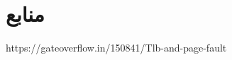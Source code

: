 \documentclass{article}
\begin{document}
\section*{منابع}
\renewcommand{\section}[2]{}%
\begin{thebibliography}{99} %


\begin{LTRitems}

\resetlatinfont

https://gateoverflow.in/150841/Tlb-and-page-fault

\end{LTRitems}

\end{thebibliography}
\end{document}
